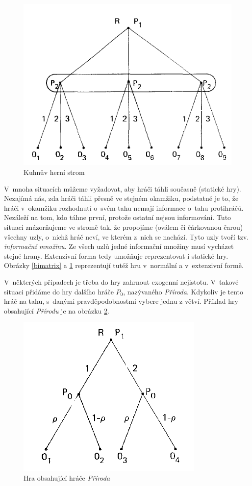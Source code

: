 \documentclass[12pt,a5paper]{article}
\begin{document}
\begin{figure}[htb]
\centering
\includegraphics[scale=0.35]{1_1.png}
\caption{Kuhnův herní strom \label{Kuhn}}
\end{figure}

V~mnoha situacích můžeme vyžadovat, aby hráči táhli současně (statické hry). Nezajímá nás, zda hráči táhli přesně ve stejném okamžiku, podstatné je to, že hráči v~okamžiku rozhodnutí o~svém tahu nemají informace o~tahu protihráčů. Nezáleží na tom, kdo táhne první, protože ostatní nejsou informováni. Tuto situaci znázorňujeme ve stromě tak, že propojíme (oválem či čárkovanou čarou) všechny uzly, o~nichž hráč neví, ve kterém z~nich se nachází. Tyto uzly tvoří tzv. \emph{informační množinu}. Ze všech uzlů jedné informační množiny musí vycházet stejné hrany. Extenzivní forma tedy umožňuje reprezentovat i statické hry. Obrázky \ref{bimatrix} a \ref{Kuhn} reprezentují tutéž hru v~normální a v~extenzivní formě.

V~některých případech je třeba do hry zahrnout exogenní nejistotu. V~takové situaci přidáme do hry dalšího hráče $P_0$, nazývaného \emph{Příroda}. Kdykoliv je tento hráč na tahu, s~danými pravděpodobnostmi vybere jednu z větví. Příklad hry obsahující \emph{Přírodu} je na obrázku \ref{nature}.

\begin{figure}[htb]
\centering
\includegraphics[scale=0.35]{1_2.png}
\caption{ Hra obsahující hráče \emph{Příroda} \label{nature}}
\end{figure}
\end{document}
